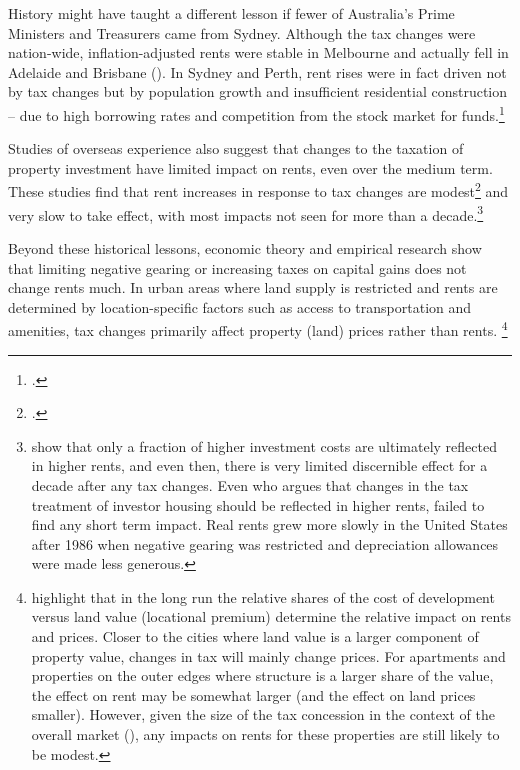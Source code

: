 History might have taught a different lesson if fewer of Australia’s Prime Ministers and Treasurers came from Sydney. Although the tax changes were nation-wide, inflation-adjusted rents were stable in Melbourne and actually fell in Adelaide and Brisbane (). In Sydney and Perth, rent rises were in fact driven not by tax changes but by population growth and insufficient residential construction – due to high borrowing rates and competition from the stock market for funds.\footcites[][186]{BadcockBrowett1991}[][47--48]{DaleyMcGannonSavageEtAl2013BalancingBudgets}

Studies of overseas experience also suggest that changes to the taxation of property investment have limited impact on rents, even over the medium term. These studies find that rent increases in response to tax changes are modest\footcite{DiPasqualeWheaton1992}  and very slow to take effect, with most impacts not seen for more than a decade.\footnote{\textcite{BlackleyFollain1996}\label{footnote:BlackleyFollain} show that only a fraction of higher investment costs are ultimately reflected in higher rents, and even then, there is very limited discernible effect for a decade after any tax changes. Even \textcite{Poterba1992} who argues that changes in the tax treatment of investor housing should be reflected in higher rents, failed to find any short term impact. Real rents grew more slowly in the United States after 1986 when negative gearing was restricted and depreciation allowances were made less generous.}\label{endnote:BlackleyFollain}

Beyond these historical lessons, economic theory and empirical research show that limiting negative gearing or increasing taxes on capital gains does not change rents much. In urban areas where land supply is restricted and rents are determined by location-specific factors such as access to transportation and amenities, tax changes primarily affect property (land) prices rather than rents.%
\footnote{\textcite{CapozzaGreenHendershott} \textcite{StapledonRoberts2016} highlight that in the long run the relative shares of the cost of development versus land value (locational premium) determine the relative impact on rents and prices. Closer to the cities where land value is a larger component of property value, changes in tax will mainly change prices. For apartments and properties on the outer edges where structure is a larger share of the value, the effect on rent may be somewhat larger (and the effect on land prices smaller). However, given the size of the tax concession in the context of the overall market (), any impacts on rents for these properties are still likely to be modest.} 

